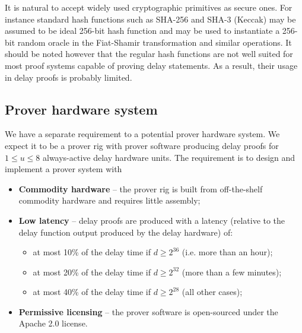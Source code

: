 \documentclass{article}
\begin{document}
It is natural to accept widely used cryptographic primitives as secure ones. For instance standard hash functions such as SHA-256 and SHA-3 (Keccak)   may be assumed to be ideal 256-bit hash function and may be used to instantiate a 256-bit random oracle in the Fiat-Shamir transformation  and similar operations. 
It should be noted however that the regular hash functions are not well suited for most proof systems capable of proving delay statements. As a result, their usage in delay proofs is probably limited. 



\subsection{ Prover hardware system}

We have a separate requirement to a potential  prover hardware system. We expect it to be a prover rig with prover software producing delay proofs for $1\leq u \leq 8$  always-active delay hardware units. The requirement is to design and implement a prover system with
\begin{itemize}
    \item  \textbf{Commodity hardware} -- the prover rig is built from off-the-shelf commodity hardware and requires little assembly;
 \item  \textbf{Low latency} -- delay proofs are produced with a latency (relative to the delay function output produced by the delay hardware) of:
 \begin{itemize}
     \item at most 10\% of the delay time if  $d\geq 2^{36}$ (i.e. more than an hour);
          \item at most 20\% of the delay time if  $d\geq 2^{32}$ (more than a few minutes);
               \item at most 40\% of the delay time if   $d \geq 2^{28}$ (all other cases);
 \end{itemize}
 \item \textbf{Permissive licensing} -- the prover software is open-sourced under the Apache 2.0 license.
\end{itemize}
\end{document}
